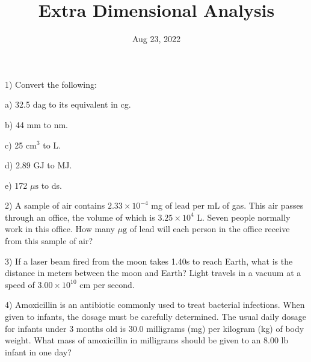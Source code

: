 \documentclass[12pt]{article}
\title{\textbf{Extra Dimensional Analysis}}
\date{Aug 23, 2022}
\begin{document}
\maketitle 

1) Convert the following:

a) 32.5 dag to its equivalent in cg.

b) 44 mm to nm.

c) 25 cm$^3$ to L.

d) 2.89 GJ to MJ.

e) 172 $\mu\text{s}$ to ds.

2) A sample of air contains $2.33 \times 10^{-4}$ mg of lead per mL of gas.
This air passes through an office, the volume of which is $3.25 \times 10^4$ L.
Seven people normally work in this office. How many $\mu\text{g}$ of lead will each
person in the office receive from this sample of air?

3) If a laser beam fired from the moon takes 1.40s to reach Earth, what is the
distance in meters between the moon and Earth? Light travels in a vacuum
at a speed of $3.00 \times 10^{10}$ cm per second.

4) Amoxicillin is an antibiotic commonly used to treat bacterial infections.
When given to infants, the dosage must be carefully determined. The usual
daily dosage for infants under 3 months old is 30.0 milligrams (mg) per kilogram
(kg) of body weight. What mass of amoxicillin in milligrams should be given to
an 8.00 lb infant in one day?
\end{document}
